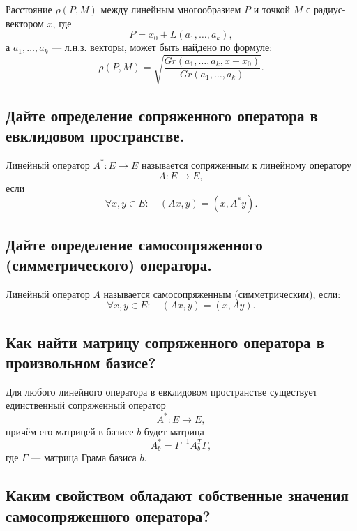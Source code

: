 \begin{theorem}
    Расстояние $\rho(P,M)$ между линейным многообразием $P$ и точкой $M$ с радиус-вектором $x$, где
    \[
        P = x_0 + L(a_1,\ldots,a_k),
    \]
    а $a_1,\ldots,a_k$ --- л.н.з. векторы, может быть найдено по формуле:
    \[
        \rho(P,M)
        =
        \sqrt{
            \frac{
                Gr(a_1,\ldots,a_k, x-x_0)
            }{
                Gr(a_1,\ldots, a_k)
            }
        }.
    \]
\end{theorem}


\subsection{Дайте определение сопряженного оператора в евклидовом пространстве.}

\begin{definition}
    Линейный оператор $A^*: E \to E$ называется сопряженным к линейному оператору
    \[
        A: E \to E,
    \]
    если
    \[
        \forall x, y \in E:\quad
        (Ax, y) = (x, A^*y).
    \]
\end{definition}
\subsection{Дайте определение самосопряженного (симметрического) оператора.}

\begin{definition}
    Линейный оператор $A$ называется самосопряженным (симметрическим), если:
    \[
        \forall x,y \in E:\quad
        (Ax, y) = (x, Ay).
    \]
\end{definition}

\subsection{Как найти матрицу сопряженного оператора в произвольном базисе?}

\begin{theorem}
    Для любого линейного оператора в евклидовом пространстве существует единственный сопряженный оператор
    \[
        A^*: E \to E,
    \]
    причём его матрицей в базисе $b$ будет матрица
    \[
        A_b^* = \Gamma^{-1}A_b^T\Gamma,
    \]
    где $\Gamma$ --- матрица Грама базиса $b$.
\end{theorem}

\subsection{Каким свойством обладают собственные значения самосопряженного оператора?}

